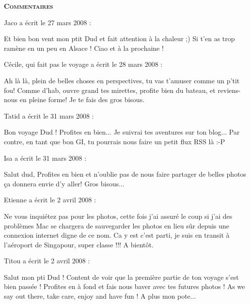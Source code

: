 \bigskip
\textbf{\textsc{Commentaires}}

\medskip
Jaco a écrit le 27 mars 2008 :
\begin{displayquote}
Et bien bon vent mon ptit Dud et fait attention à la chaleur ;) Si t'en as trop ramène en un peu en Alsace !
Ciao et à la prochaine !
\end{displayquote}

\medskip
Cécile, qui fait pas le voyage a écrit le 28 mars 2008 :
\begin{displayquote}
Ah là là, plein de belles choses en perspectives, tu vas t'amuser comme un p'tit fou! Comme d'hab, ouvre grand tes mirettes, profite bien du bateau, et reviens-nous en pleine forme!
Je te fais des gros bisous.
\end{displayquote}

\medskip
Tatid a écrit le 31 mars 2008 :
\begin{displayquote}
Bon voyage Dud ! Profites en bien... Je suivrai tes aventures sur ton blog... Par contre, en tant que bon GI, tu pourrais nous faire un petit flux RSS là :-P
\end{displayquote}

\medskip
Isa a écrit le 31 mars 2008 :
\begin{displayquote}
Salut dud,
Profites en bien et n'oublie pas de nous faire partager de belles photos ça donnera envie d'y aller!
Gros bisous...
\end{displayquote}

\medskip
Etienne a écrit le 2 avril 2008 :
\begin{displayquote}
Ne vous inquiétez pas pour les photos, cette fois j'ai assuré le coup si j'ai des problèmes Mac se chargera de sauvegarder les photos en lieu sûr depuis une connexion internet digne de ce nom.
Ca y est c'est parti, je suis en transit à l'aéroport de Singapour, super classe !!!
A bientôt.
\end{displayquote}

\medskip
Titou a écrit le 2 avril 2008 :
\begin{displayquote}
Salut mon pti Dud ! Content de voir que la première partie de ton voyage s'est bien passée ! Profites en à fond et fais nous baver avec tes futures photos !
As we say out there, take care, enjoy and have fun !
A plus mon pote...
\end{displayquote}

\vfill
